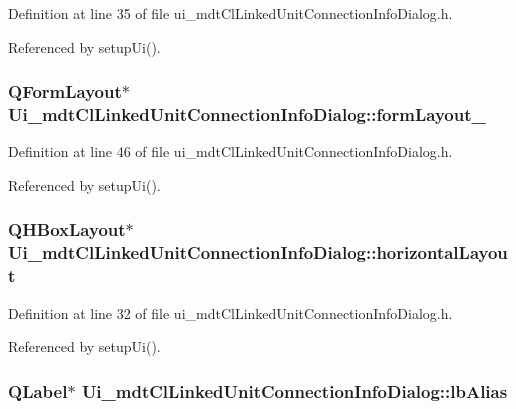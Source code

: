 Definition at line 35 of file ui\-\_\-mdt\-Cl\-Linked\-Unit\-Connection\-Info\-Dialog.\-h.



Referenced by setup\-Ui().

\hypertarget{class_ui__mdt_cl_linked_unit_connection_info_dialog_acc2eeb39df02089837132406e974c700}{
\subsubsection[{form\-Layout\-\_\-2}]{\setlength{\rightskip}{0pt plus 5cm}Q\-Form\-Layout$\ast$ Ui\-\_\-mdt\-Cl\-Linked\-Unit\-Connection\-Info\-Dialog\-::form\-Layout\-\_}}\label{class_ui__mdt_cl_linked_unit_connection_info_dialog_acc2eeb39df02089837132406e974c700}


Definition at line 46 of file ui\-\_\-mdt\-Cl\-Linked\-Unit\-Connection\-Info\-Dialog.\-h.



Referenced by setup\-Ui().

\hypertarget{class_ui__mdt_cl_linked_unit_connection_info_dialog_a49318086b7dc4edead8eeaae323f06a1}{
\subsubsection[{horizontal\-Layout}]{\setlength{\rightskip}{0pt plus 5cm}Q\-H\-Box\-Layout$\ast$ Ui\-\_\-mdt\-Cl\-Linked\-Unit\-Connection\-Info\-Dialog\-::horizontal\-Layout}}\label{class_ui__mdt_cl_linked_unit_connection_info_dialog_a49318086b7dc4edead8eeaae323f06a1}


Definition at line 32 of file ui\-\_\-mdt\-Cl\-Linked\-Unit\-Connection\-Info\-Dialog.\-h.



Referenced by setup\-Ui().

\hypertarget{class_ui__mdt_cl_linked_unit_connection_info_dialog_a6e011a3905403140c54a631a3f8907ef}{
\subsubsection[{lb\-Alias}]{\setlength{\rightskip}{0pt plus 5cm}Q\-Label$\ast$ Ui\-\_\-mdt\-Cl\-Linked\-Unit\-Connection\-Info\-Dialog\-::lb\-Alias}}\label{class_ui__mdt_cl_linked_unit_connection_info_dialog_a6e011a3905403140c54a631a3f8907ef}



